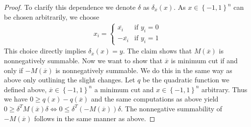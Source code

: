 \documentclass[12pt,a4paper]{article}
\theoremstyle{mythm}
\begin{document}
\begin{proof}
To clarify this dependence we denote $ \delta $ as $ \delta _{ \overline{ x }  } \left( x \right)  $.
As $ x \in \left\{ -1,1 \right\} ^{ n } $ can be chosen arbitrarily, we choose
\begin{align*}
x_i = \begin{cases}
\overline{ x_i }  & \text{if } y_i=0 \\
- \overline{ x_i } & \text{if } y_i=1
\end{cases}
\end{align*} 
This choice directly implies $ \delta _{ \overline{ x }  } \left( x \right) = y $.
The claim shows that $ M ( \overline{ x }  )  $ is nonnegatively summable.
Now we want to show that $ \overline{ x }  $ is minimum cut if and only if $ -  M( \overline{ x } ) $ is nonnegatively summable. 
We do this in the same way as above only outlining the slight changes. Let $ q $ be the quadratic function we defined above, $ \overline{ x } \in \left\{ -1,1 \right\} ^{ n }
$ a minimum cut and $ x \in \left\{ -1,1 \right\} ^{ n }  $ arbitrary. Thus we have $ 0 \geq  q(x) - q( \overline{ x } ) $ and the same computations as above yield $ 0 \geq
\delta ^T M ( \overline{ x } ) \delta \Leftrightarrow 0 \leq \delta ^T  \left( -M( \overline{ x } ) \right) \delta  $. The nonnegative summability of $ - M(
\overline{ x } ) $ follows in the same manner as above.
\end{proof}
\end{document}
